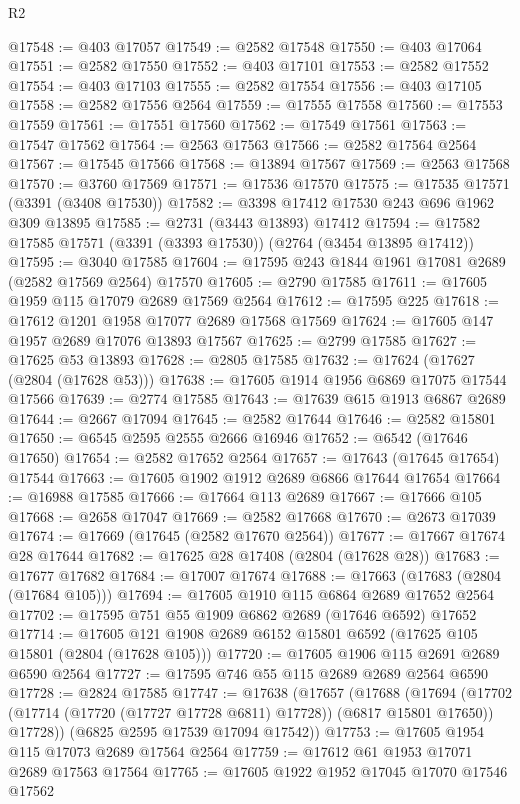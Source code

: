 \begin{lexlean}{R2}
\begin{coremodule}
@17548 := @403 @17057
@17549 := @2582 @17548
@17550 := @403 @17064
@17551 := @2582 @17550
@17552 := @403 @17101
@17553 := @2582 @17552
@17554 := @403 @17103
@17555 := @2582 @17554
@17556 := @403 @17105
@17558 := @2582 @17556 @2564
@17559 := @17555 @17558
@17560 := @17553 @17559
@17561 := @17551 @17560
@17562 := @17549 @17561
@17563 := @17547 @17562
@17564 := @2563 @17563
@17566 := @2582 @17564 @2564
@17567 := @17545 @17566
@17568 := @13894 @17567
@17569 := @2563 @17568
@17570 := @3760 @17569
@17571 := @17536 @17570
@17575 := @17535 @17571 (@3391 (@3408 @17530))
@17582 := @3398 @17412 @17530 @243 @696 @1962 @309 @13895
@17585 := @2731 (@3443 @13893) @17412
@17594 := @17582 @17585 @17571 (@3391 (@3393 @17530)) (@2764 (@3454 @13895 @17412))
@17595 := @3040 @17585
@17604 := @17595 @243 @1844 @1961 @17081 @2689 (@2582 @17569 @2564) @17570
@17605 := @2790 @17585
@17611 := @17605 @1959 @115 @17079 @2689 @17569 @2564
@17612 := @17595 @225
@17618 := @17612 @1201 @1958 @17077 @2689 @17568 @17569
@17624 := @17605 @147 @1957 @2689 @17076 @13893 @17567
@17625 := @2799 @17585
@17627 := @17625 @53 @13893
@17628 := @2805 @17585
@17632 := @17624 (@17627 (@2804 (@17628 @53)))
@17638 := @17605 @1914 @1956 @6869 @17075 @17544 @17566
@17639 := @2774 @17585
@17643 := @17639 @615 @1913 @6867 @2689
@17644 := @2667 @17094
@17645 := @2582 @17644
@17646 := @2582 @15801
@17650 := @6545 @2595 @2555 @2666 @16946
@17652 := @6542 (@17646 @17650)
@17654 := @2582 @17652 @2564
@17657 := @17643 (@17645 @17654) @17544
@17663 := @17605 @1902 @1912 @2689 @6866 @17644 @17654
@17664 := @16988 @17585
@17666 := @17664 @113 @2689
@17667 := @17666 @105
@17668 := @2658 @17047
@17669 := @2582 @17668
@17670 := @2673 @17039
@17674 := @17669 (@17645 (@2582 @17670 @2564))
@17677 := @17667 @17674 @28 @17644
@17682 := @17625 @28 @17408 (@2804 (@17628 @28))
@17683 := @17677 @17682
@17684 := @17007 @17674
@17688 := @17663 (@17683 (@2804 (@17684 @105)))
@17694 := @17605 @1910 @115 @6864 @2689 @17652 @2564
@17702 := @17595 @751 @55 @1909 @6862 @2689 (@17646 @6592) @17652
@17714 := @17605 @121 @1908 @2689 @6152 @15801 @6592 (@17625 @105 @15801 (@2804 (@17628 @105)))
@17720 := @17605 @1906 @115 @2691 @2689 @6590 @2564
@17727 := @17595 @746 @55 @115 @2689 @2689 @2564 @6590
@17728 := @2824 @17585
@17747 := @17638
    (@17657
      (@17688
        (@17694
          (@17702 (@17714 (@17720 (@17727 @17728 @6811) @17728)) (@6817 @15801 @17650))
          @17728))
      (@6825 @2595 @17539 @17094 @17542))
@17753 := @17605 @1954 @115 @17073 @2689 @17564 @2564
@17759 := @17612 @61 @1953 @17071 @2689 @17563 @17564
@17765 := @17605 @1922 @1952 @17045 @17070 @17546 @17562

\end{coremodule}
\end{lexlean}
